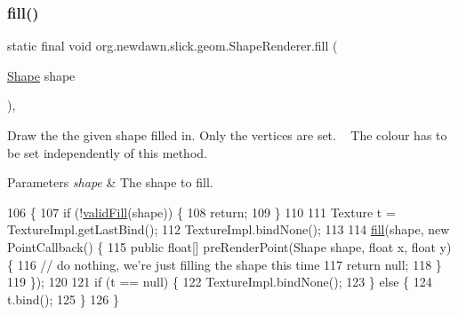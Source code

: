 \subsubsection{\texorpdfstring{fill()}{fill()}\hspace{0.1cm}{\footnotesize\ttfamily [1/3]}}
{\footnotesize\ttfamily static final void org.\+newdawn.\+slick.\+geom.\+Shape\+Renderer.\+fill (\begin{DoxyParamCaption}\item[{\mbox{\hyperlink{classorg_1_1newdawn_1_1slick_1_1geom_1_1_shape}{Shape}}}]{shape }\end{DoxyParamCaption})\hspace{0.3cm}{\ttfamily [inline]}, {\ttfamily [static]}}

Draw the the given shape filled in. Only the vertices are set. ~\newline
The colour has to be set independently of this method.


\begin{DoxyParams}{Parameters}
{\em shape} & The shape to fill. \\
\hline
\end{DoxyParams}

\begin{DoxyCode}
106                                                \{
107         \textcolor{keywordflow}{if} (!\mbox{\hyperlink{classorg_1_1newdawn_1_1slick_1_1geom_1_1_shape_renderer_a1e630761b7f3631a05e0eb8e9d9ce091}{validFill}}(shape)) \{
108             \textcolor{keywordflow}{return};
109         \}
110         
111         Texture t = TextureImpl.getLastBind();
112         TextureImpl.bindNone();
113         
114         \mbox{\hyperlink{classorg_1_1newdawn_1_1slick_1_1geom_1_1_shape_renderer_a798dd59aef1deb87fdfcc4fbff59ecef}{fill}}(shape, \textcolor{keyword}{new} PointCallback() \{
115             \textcolor{keyword}{public} \textcolor{keywordtype}{float}[] preRenderPoint(Shape shape, \textcolor{keywordtype}{float} x, \textcolor{keywordtype}{float} y) \{
116                 \textcolor{comment}{// do nothing, we're just filling the shape this time}
117                 \textcolor{keywordflow}{return} null;
118             \}
119         \});
120         
121         \textcolor{keywordflow}{if} (t == null) \{
122             TextureImpl.bindNone();
123         \} \textcolor{keywordflow}{else} \{
124             t.bind();
125         \}
126     \}
\end{DoxyCode}
\mbox{\label{classorg_1_1newdawn_1_1slick_1_1geom_1_1_shape_renderer_a1d5b35119abcdbd5566e8b6f604aa931}} 
